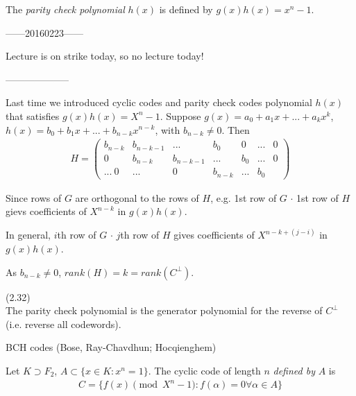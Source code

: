 \documentclass[a4paper]{article}
\begin{document}
\begin{defi}
The \emph{parity check polynomial} $h(x)$ is defined by $g(x) h(x) = x^n-1$.
\end{defi}

------20160223------

Lecture is on strike today, so no lecture today!

--------------------

Last time we introduced cyclic codes and parity check codes polynomial $h(x)$ that satisfies $g(x) h(x) = X^n-1$. Suppose $g(x) = a_0+a_1 x + ... + a_k x^k$, $h(x) = b_0+b_1x + ... + b_{n-k} x^{n-k}$, with $b_{n-k} \neq 0$. Then
\begin{equation*}
\begin{aligned}
H = \begin{pmatrix}
b_{n-k} & b_{n-k-1} & ... & b_0 & 0 & ... & 0\\
0 & b_{n-k} & b_{n-k-1} & ... & b_0 & ... & 0\\
...\
0 & ... & 0 & b_{n-k} & ... & b_0
\end{pmatrix}
\end{aligned}
\end{equation*}

Since rows of $G$ are orthogonal to the rows of $H$, e.g. 1st row of $G$ $\cdot$ 1st row of $H$ gievs coefficients of $X^{n-k}$ in $g(x)h(x)$.

In general, $i$th row of $G$ $\cdot$ $j$th row of $H$ gives coefficients of $X^{n-k+(j-i)}$ in $g(x)h(x)$.

As $b_{n-k} \neq 0$, $rank(H) = k = rank(C^\perp)$.

\begin{lemma} (2.32)\\
The parity check polynomial is the generator polynomial for the reverse of $C^\perp$ (i.e. reverse all codewords).
\end{lemma}

BCH codes (Bose, Ray-Chavdhun; Hocqienghem)

\begin{defi}
Let $K \supset F_2$, $A \subset \{x \in K: x^n=1\}$. The cyclic code of length $n$ \emph{defined by} $A$ is
\begin{equation*}
\begin{aligned}
C = \{ f(x) \pmod {X^n-1} : f(\alpha) = 0 \forall \alpha \in A\}
\end{aligned}
\end{equation*}
\end{defi}
\end{document}
